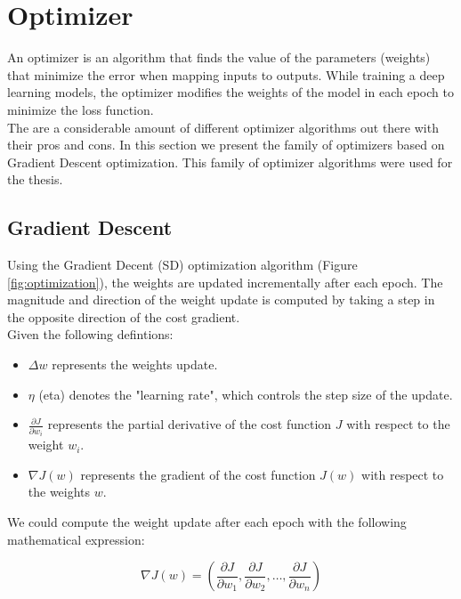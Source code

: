 \newpage

\section{Optimizer}

An optimizer is an algorithm that finds the value of the parameters (weights)
that minimize the error when mapping inputs to outputs. While training a deep
learning models, the optimizer modifies the weights of the model in each epoch
to minimize the loss function. \\

The are a considerable amount of different optimizer algorithms out there with
their pros and cons. In this section we present the family of optimizers based
on Gradient Descent optimization. This family of optimizer algorithms were used
for the thesis. \\

\subsection{Gradient Descent}

Using the Gradient Decent (SD) optimization algorithm (Figure
\ref{fig:optimization}), the weights are updated incrementally after each
epoch. The magnitude and direction of the weight update is computed by taking a
step in the opposite direction of the cost gradient. \\

Given the following defintions:

\begin{itemize}
  \item \(\Delta w\) represents the weights update.
  \item \(\eta\) (eta) denotes the "learning rate", which controls the step size of the update.
  \item  \(\frac{\partial J}{\partial w_i}\) represents the partial derivative of the cost function \(J\) with respect to the weight \(w_i\).
  \item \(\nabla J(w)\) represents the gradient of the cost function \(J(w)\) with respect to the weights \(w\).
\end{itemize}

We could compute the weight update after each epoch with the following
mathematical expression:

\[\nabla J(w) = (\frac{\partial J}{\partial w_1}, \frac{\partial J}{\partial w_2}, \ldots, \frac{\partial J}{\partial w_n})\]

